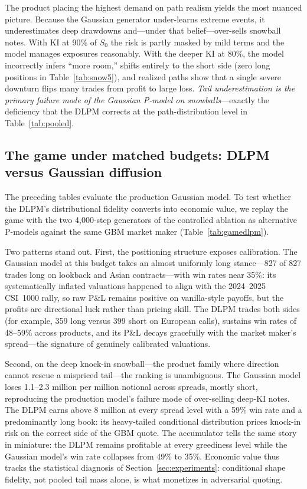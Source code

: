 \documentclass[12pt,letterpaper]{article}
\begin{document}
The product placing the highest demand on path realism yields the most
nuanced picture. Because the Gaussian generator under-learns extreme events,
it underestimates deep drawdowns and---under that belief---over-sells
snowball notes. With KI at 90\% of $S_0$ the risk is partly masked by mild
terms and the model manages exposures reasonably. With the deeper KI at
80\%, the model incorrectly infers ``more room,'' shifts entirely to the
short side (zero long positions in Table~\ref{tab:snow5}), and realized
paths show that a single severe downturn flips many trades from profit to
large loss. \emph{Tail underestimation is the primary failure mode of the
Gaussian P-model on snowballs}---exactly the deficiency that the DLPM
corrects at the path-distribution level in Table~\ref{tab:pooled}.

\subsection{The game under matched budgets: DLPM versus Gaussian diffusion}
\label{sec:gamedlpm}

The preceding tables evaluate the production Gaussian model. To test whether
the DLPM's distributional fidelity converts into economic value, we replay
the game with the two 4{,}000-step generators of the controlled ablation as
alternative P-models against the same GBM market maker
(Table~\ref{tab:gamedlpm}).


Two patterns stand out. First, the positioning structure exposes
calibration. The Gaussian model at this budget takes an almost uniformly
long stance---827 of 827 trades long on lookback and Asian contracts---with
win rates near 35\%: its systematically inflated valuations happened to
align with the 2024--2025 CSI~1000 rally, so raw P\&L remains positive on
vanilla-style payoffs, but the profits are directional luck rather than
pricing skill. The DLPM trades both sides (for example, 359 long versus 399
short on European calls), sustains win rates of 48--59\% across products,
and its P\&L decays gracefully with the market maker's spread---the
signature of genuinely calibrated valuations.

Second, on the deep knock-in snowball---the product family where direction
cannot rescue a mispriced tail---the ranking is unambiguous. The Gaussian
model loses 1.1--2.3 million per million notional across spreads, mostly
short, reproducing the production model's failure mode of over-selling
deep-KI notes. The DLPM earns above 8 million at every spread level with a
59\% win rate and a predominantly long book: its heavy-tailed conditional
distribution prices knock-in risk on the correct side of the GBM quote. The
accumulator tells the same story in miniature: the DLPM remains profitable
at every greediness level while the Gaussian model's win rate collapses
from 49\% to 35\%. Economic value thus tracks the statistical diagnosis of
Section~\ref{sec:experiments}: conditional shape fidelity, not pooled tail
mass alone, is what monetizes in adversarial quoting.
\end{document}

